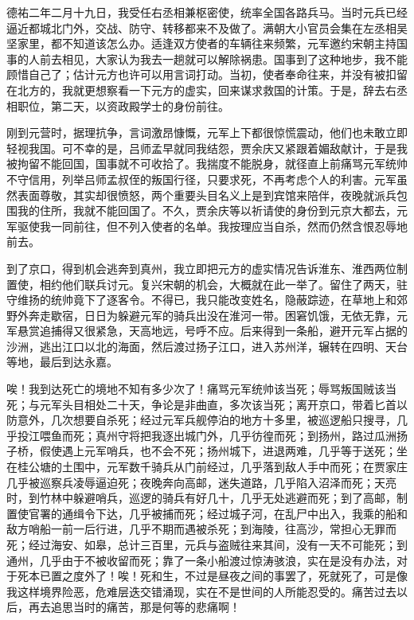 \documentclass[12pt,UTF-8,openany]{ctexbook}
\begin{document}
\vspace{1em}

\begin{normalsize}
    
    德祐二年二月十九日，我受任右丞相兼枢密使，统率全国各路兵马。当时元兵已经逼近都城北门外，交战、防守、转移都来不及做了。满朝大小官员会集在左丞相吴坚家里，都不知道该怎么办。适逢双方使者的车辆往来频繁，元军邀约宋朝主持国事的人前去相见，大家认为我去一趟就可以解除祸患。国事到了这种地步，我不能顾惜自己了；估计元方也许可以用言词打动。当初，使者奉命往来，并没有被扣留在北方的，我就更想察看一下元方的虚实，回来谋求救国的计策。于是，辞去右丞相职位，第二天，以资政殿学士的身份前往。
    
    刚到元营时，据理抗争，言词激昂慷慨，元军上下都很惊慌震动，他们也未敢立即轻视我国。可不幸的是，吕师孟早就同我结怨，贾余庆又紧跟着媚敌献计，于是我被拘留不能回国，国事就不可收拾了。我揣度不能脱身，就径直上前痛骂元军统帅不守信用，列举吕师孟叔侄的叛国行径，只要求死，不再考虑个人的利害。元军虽然表面尊敬，其实却很愤怒，两个重要头目名义上是到宾馆来陪伴，夜晚就派兵包围我的住所，我就不能回国了。不久，贾余庆等以祈请使的身份到元京大都去，元军驱使我一同前往，但不列入使者的名单。我按理应当自杀，然而仍然含恨忍辱地前去。
    
    到了京口，得到机会逃奔到真州，我立即把元方的虚实情况告诉淮东、淮西两位制置使，相约他们联兵讨元。复兴宋朝的机会，大概就在此一举了。留住了两天，驻守维扬的统帅竟下了逐客令。不得已，我只能改变姓名，隐蔽踪迹，在草地上和郊野外奔走歇宿，日日为躲避元军的骑兵出没在淮河一带。困窘饥饿，无依无靠，元军悬赏追捕得又很紧急，天高地远，号呼不应。后来得到一条船，避开元军占据的沙洲，逃出江口以北的海面，然后渡过扬子江口，进入苏州洋，辗转在四明、天台等地，最后到达永嘉。
    
    唉！我到达死亡的境地不知有多少次了！痛骂元军统帅该当死；辱骂叛国贼该当死；与元军头目相处二十天，争论是非曲直，多次该当死；离开京口，带着匕首以防意外，几次想要自杀死；经过元军兵舰停泊的地方十多里，被巡逻船只搜寻，几乎投江喂鱼而死；真州守将把我逐出城门外，几乎彷徨而死；到扬州，路过瓜洲扬子桥，假使遇上元军哨兵，也不会不死；扬州城下，进退两难，几乎等于送死；坐在桂公塘的土围中，元军数千骑兵从门前经过，几乎落到敌人手中而死；在贾家庄几乎被巡察兵凌辱逼迫死；夜晚奔向高邮，迷失道路，几乎陷入沼泽而死；天亮时，到竹林中躲避哨兵，巡逻的骑兵有好几十，几乎无处逃避而死；到了高邮，制置使官署的通缉令下达，几乎被捕而死；经过城子河，在乱尸中出入，我乘的船和敌方哨船一前一后行进，几乎不期而遇被杀死；到海陵，往高沙，常担心无罪而死；经过海安、如皋，总计三百里，元兵与盗贼往来其间，没有一天不可能死；到通州，几乎由于不被收留而死；靠了一条小船渡过惊涛骇浪，实在是没有办法，对于死本已置之度外了！唉！死和生，不过是昼夜之间的事罢了，死就死了，可是像我这样境界险恶，危难层迭交错涌现，实在不是世间的人所能忍受的。痛苦过去以后，再去追思当时的痛苦，那是何等的悲痛啊！
    

\end{normalsize}
\end{document}
